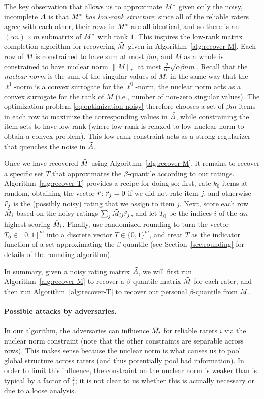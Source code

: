 The key observation that allows us to approximate $M^*$ given only the noisy, 
incomplete $\tilde{A}$ is that \emph{$M^*$ has low-rank structure}: since all 
of the reliable raters agree with each other, their rows in $M^*$ are all 
identical, and so there is an $(\alpha n) \times m$ submatrix of $M^*$ with 
rank $1$. This inspires the low-rank matrix completion algorithm for recovering 
$\tilde{M}$ given in Algorithm~\ref{alg:recover-M}. Each row of $M$ is constrained 
to have sum at most $\beta m$, and $M$ as a whole is constrained to have 
nuclear norm $\|M\|_*$ at most $\frac{2}{\alpha \epsilon}\sqrt{\alpha\beta nm}$. 
Recall that the \emph{nuclear norm} is the sum of the singular values of 
$M$; in the same way that the $\ell^1$-norm is a convex surrogate for the 
$\ell^0$-norm, the nuclear norm acts as a convex surrogate for the rank of $M$ 
(i.e., number of non-zero singular values). The optimization problem 
\eqref{eq:optimization-noisy} therefore chooses a set of $\beta m$ items in each 
row to maximize the corresponding values in $\tilde{A}$, while constraining the item 
sets to have low rank (where low rank is relaxed to low nuclear norm to obtain 
a convex problem). 
This low-rank constraint acts as a strong regularizer that quenches the noise 
in $\tilde{A}$.



Once we have recovered $\tilde{M}$ using Algorithm~\ref{alg:recover-M}, it remains to 
recover a specific set $T$ that approximates the $\beta$-quantile according to 
our ratings. Algorithm~\ref{alg:recover-T} provides a recipe for doing so: 
first, rate $k_0$ items at random, obtaining the vector $\tilde{r}$:
$\tilde{r}_j = 0$ if we did not rate item $j$, and otherwise $\tilde{r}_j$ is 
the (possibly noisy) rating that we assign to item $j$. Next, score each 
row $\tilde{M}_{i}$ based on the noisy ratings $\sum_j \tilde{M}_{ij}\tilde{r}_j$, and let $T_0$ be the 
indices $i$ of the $\alpha n$ highest-scoring $\tilde{M}_i$.
Finally, use randomized rounding to turn the vector $T_0 \in [0,1]^m$ into 
a discrete vector $T \in \{0,1\}^m$, and treat $T$ as the indicator function 
of a set approximating the $\beta$-quantile
(see Section~\ref{sec:rounding} for details of the rounding algorithm).

In summary, given a noisy rating matrix $\tilde{A}$, we will first run 
Algorithm~\ref{alg:recover-M} to recover a $\beta$-quantile matrix $\tilde{M}$ for 
each rater, and then run Algorithm~\ref{alg:recover-T} to recover our 
personal $\beta$-quantile from $\tilde{M}$.

\paragraph{Possible attacks by adversaries.} In our algorithm, 
the adversaries can influence $\tilde{M}_i$ for reliable raters $i$ via 
the nuclear norm constraint (note that the other constraints are 
separable across rows). This makes sense because 
the nuclear norm is what causes us to pool global structure across 
raters (and thus potentially pool bad information). In order to 
limit this influence, the constraint on the 
nuclear norm is weaker than is typical by a factor of $\frac{2}{\epsilon}$; 
it is not clear to us whether this is actually necessary or due to a 
loose analysis.

